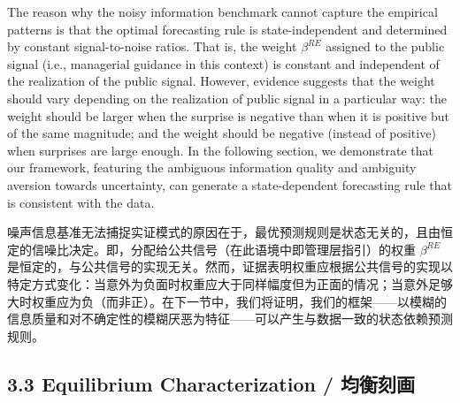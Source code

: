 \documentclass[12pt,a4paper]{article}
\newenvironment{original}
  {\par\medskip\noindent\ignorespaces}
  {\par\medskip}
\newenvironment{translation}
  {\par\noindent{\color{transblue}\ignorespaces}}
  {\par\bigskip}
\begin{document}
\begin{original}
The reason why the noisy information benchmark cannot capture the empirical patterns is that the optimal forecasting rule is state-independent and determined by constant signal-to-noise ratios. That is, the weight $\beta^{RE}$ assigned to the public signal (i.e., managerial guidance in this context) is constant and independent of the realization of the public signal. However, evidence suggests that the weight should vary depending on the realization of public signal in a particular way: the weight should be larger when the surprise is negative than when it is positive but of the same magnitude; and the weight should be negative (instead of positive) when surprises are large enough. In the following section, we demonstrate that our framework, featuring the ambiguous information quality and ambiguity aversion towards uncertainty, can generate a state-dependent forecasting rule that is consistent with the data.
\end{original}
\begin{translation}
噪声信息基准无法捕捉实证模式的原因在于，最优预测规则是状态无关的，且由恒定的信噪比决定。即，分配给公共信号（在此语境中即管理层指引）的权重 $\beta^{RE}$ 是恒定的，与公共信号的实现无关。然而，证据表明权重应根据公共信号的实现以特定方式变化：当意外为负面时权重应大于同样幅度但为正面的情况；当意外足够大时权重应为负（而非正）。在下一节中，我们将证明，我们的框架——以模糊的信息质量和对不确定性的模糊厌恶为特征——可以产生与数据一致的状态依赖预测规则。
\end{translation}

\subsection{3.3 Equilibrium Characterization / 均衡刻画}
\end{document}
